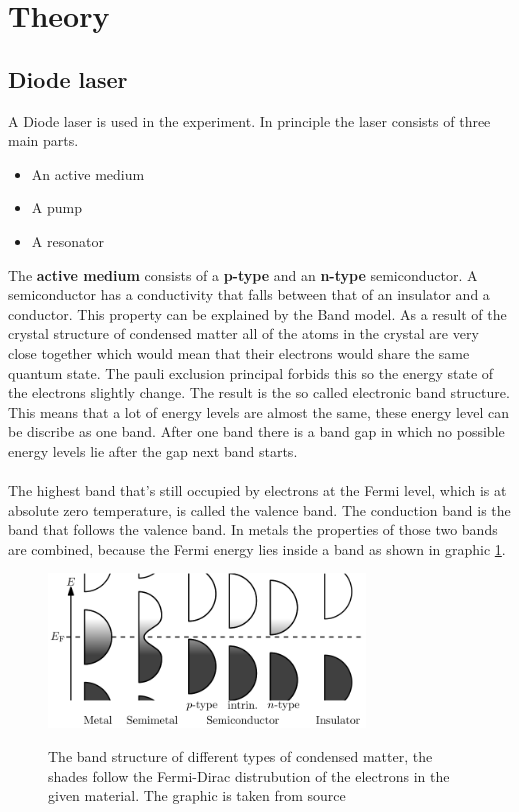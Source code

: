 \section{Theory}
\label{sec:Theorie}

\subsection{Diode laser}

A Diode laser is used in the experiment.
In principle the laser consists of three main parts.
\begin{itemize}
    \item An active medium
    \item A pump
    \item A resonator
\end{itemize}
The \textbf{active medium} consists of a \textbf{p-type} and an \textbf{n-type} semiconductor.
A semiconductor has a conductivity that falls between that of an insulator and a conductor.
This property can be explained by the Band model. 
As a result of the crystal structure of condensed matter all of the atoms in the crystal are very close together which would mean that their electrons would share the same quantum state.
The pauli exclusion principal forbids this so the energy state of the electrons slightly change.
The result is the so called electronic band structure.
This means that a lot of energy levels are almost the same, these energy level can be discribe as one band.
After one band there is a band gap in which no possible energy levels lie after the gap next band starts.
\\\\
The highest band that's still occupied by electrons at the Fermi level, which is at absolute zero temperature, is called the valence band.
The conduction band is the band that follows the valence band.
In metals the properties of those two bands are combined, because the Fermi energy lies inside a band as shown in graphic \ref{fig:band_structure}.

\begin{figure}
    \centering
    \caption{The band structure of different types of condensed matter, the shades follow the Fermi-Dirac distrubution of the electrons in the given material. The graphic is taken from source \cite{wikipedia_valence_conduction_band}}
    \includegraphics[width=0.75\textwidth]{content/data/Band_structure_diffrent_materials.png}
    \label{fig:band_structure}
\end{figure}

